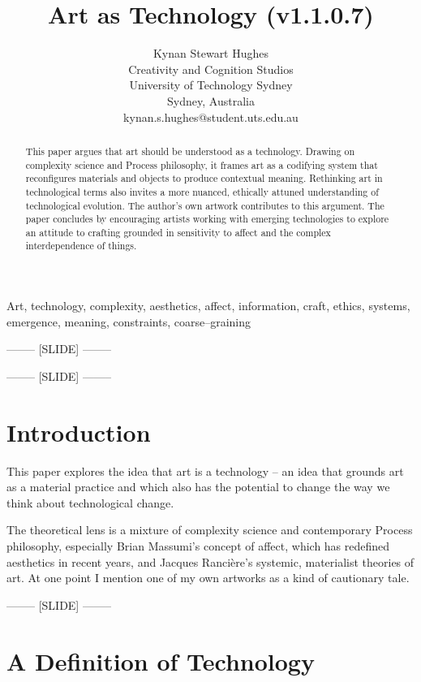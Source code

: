 \documentclass[letter:wpaper]{article}
\title{Art as Technology (v1.1.0.7)}
\author{Kynan Stewart Hughes\\
Creativity and Cognition Studios\\
University of Technology Sydney\\
Sydney, Australia\\
kynan.s.hughes@student.uts.edu.au\\
\newline
\newline
}
\begin{document}
 
\maketitle
\begin{abstract}
    This paper argues that art should be understood as a technology. Drawing on complexity science and Process philosophy, it frames art as a codifying system that reconfigures materials and objects to produce contextual meaning. Rethinking art in technological terms also invites a more nuanced, ethically attuned understanding of technological evolution. The author’s own artwork contributes to this argument. The paper concludes by encouraging artists working with emerging technologies to explore an attitude to crafting grounded in sensitivity to affect and the complex interdependence of things.
\end{abstract}


Art, technology, complexity, aesthetics, affect, information, craft, ethics, systems, emergence, meaning, constraints, coarse–graining

-------- [SLIDE] --------

-------- [SLIDE] --------

\section{Introduction}

    This paper explores the idea that art is a technology \citep[pp.74–75]{SauvagnarguesArtmchns2016} \citep{GellThTchnlgyOfEnchntmnt1992} \citep[p.202]{OSullivanFrmAsthtcsToThAbstrctMchn2010} -- an idea that grounds art as a material practice and which also has the potential to change the way we think about technological change. 
    
    The theoretical lens is a mixture of complexity science and contemporary Process philosophy, especially Brian Massumi's concept of affect, which has redefined aesthetics in recent years, and Jacques Rancière's systemic, materialist theories of art. At one point I mention one of my own artworks as a kind of cautionary tale.

-------- [SLIDE] --------

\section{A Definition of Technology} 
\end{document}

